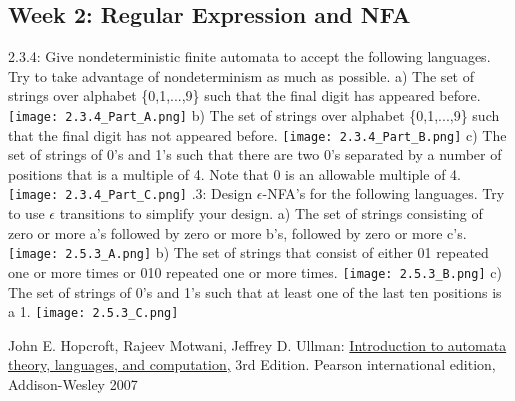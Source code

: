 \documentclass{article}
\theoremstyle{theorem}
\theoremstyle{definition}
\theoremstyle{remark}
\begin{document}
\subsection{Week 2: Regular Expression and NFA}
2.3.4: Give nondeterministic finite automata to accept the following languages. Try to take advantage of nondeterminism as much as possible. 
\newline \indent a) The set of strings over alphabet \{0,1,...,9\} such that the final digit has appeared before. 
\newline \indent \texttt{[image: 2.3.4\_Part\_A.png]}
\newline \indent b) The set of strings over alphabet \{0,1,...,9\} such that the final digit has not appeared before.
\newline \indent \texttt{[image: 2.3.4\_Part\_B.png]}
\newline \indent c) The set of strings of 0's and 1's such that there are two 0's separated by a number of positions that is a multiple of 4. Note that 0 is an allowable multiple of 4.
\newline \indent \texttt{[image: 2.3.4\_Part\_C.png]}
.3: Design  $\epsilon$-NFA's for the following languages. Try to use $\epsilon$ transitions to simplify your design. 
\newline \indent a) The set of strings consisting of zero or more a's followed by zero or more b's, followed by zero or more c's. 
\newline \indent \texttt{[image: 2.5.3\_A.png]}
\newline \indent b) The set of strings that consist of either 01 repeated one or more times or 010 repeated one or more times. 
\newline \indent \texttt{[image: 2.5.3\_B.png]}
\newline \indent c) The set of strings of 0's and 1's such that at least one of the last ten positions is a 1. 
\newline \indent \texttt{[image: 2.5.3\_C.png]}





\begin{thebibliography}{99}
	John E. Hopcroft, Rajeev Motwani, Jeffrey D. Ullman:
\href{http://ce.sharif.edu/courses/94-95/1/ce414-2/resources/root/Text%20Books/Automata/John%20E.%20Hopcroft,%20Rajeev%20Motwani,%20Jeffrey%20D.%20Ullman-Introduction%20to%20Automata%20Theory,%20Languages,%20and%20Computations-Prentice%20Hall%20(2006).pdf}{Introduction to automata theory, languages, and computation,} 3rd Edition. Pearson international edition, Addison-Wesley 2007

\end{thebibliography}
\end{document}
